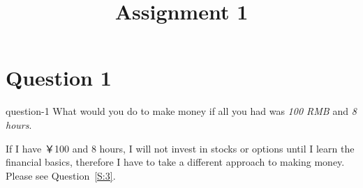 \title{Assignment 1}
\maketitle

\section{Question 1}\label{S:1}
\begin{statebox}{}{question-1}
    What would you do to make money if all you had was \emph{100 RMB} and \emph{8 hours}.
\end{statebox}
If I have ￥100 and 8 hours, I will not invest in stocks or options until I learn the financial basics, therefore I have to take a different approach to making money. Please see Question~\ref{S:3}.



